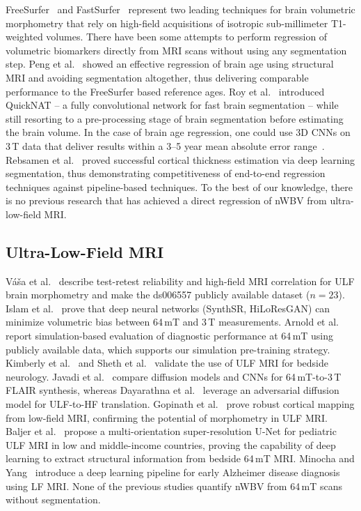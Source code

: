 \documentclass{ieeeaccess}
\begin{document}
FreeSurfer~\cite{fischl2012freesurfer} and
FastSurfer~\cite{henschel2020fastsurfer} represent two leading techniques for
brain volumetric morphometry that rely on high-field acquisitions of isotropic
sub-millimeter T1-weighted volumes. There have been some attempts to perform
regression of volumetric biomarkers directly from MRI scans without using any
segmentation step. Peng et al.~\cite{peng2021brain} showed an effective
regression of brain age using structural MRI and avoiding segmentation
altogether, thus delivering comparable performance to the FreeSurfer based
reference ages. Roy et al.~\cite{roy2019quicknat} introduced QuickNAT -- a
fully convolutional network for fast brain segmentation -- while still
resorting to a pre-processing stage of brain segmentation before estimating
the brain volume. In the case of brain age regression, one could use 3D CNNs
on 3\,T data that deliver results within a 3--5 year mean absolute error
range~\cite{cole2017predicting,jonsson2019brain}. Rebsamen et
al.~\cite{rebsamen2020cortical} proved successful cortical thickness estimation
via deep learning segmentation, thus demonstrating competitiveness of
end-to-end regression techniques against pipeline-based techniques. To the
best of our knowledge, there is no previous research that has achieved a
direct regression of nWBV from ultra-low-field MRI.

\subsection{Ultra-Low-Field MRI}

V{\'a}{\v s}a et al.~\cite{vasa2025imaneur,vasa2025} describe test-retest
reliability and high-field MRI correlation for ULF brain morphometry and make
the ds006557 publicly available dataset ($n = 23$). Islam et
al.~\cite{islam2025aibrain} prove that deep neural networks (SynthSR,
HiLoResGAN) can minimize volumetric bias between 64\,mT and 3\,T
measurements. Arnold et al.~\cite{arnold2022simulated} report
simulation-based evaluation of diagnostic performance at 64\,mT using
publicly available data, which supports our simulation pre-training strategy.
Kimberly et al.~\cite{kimberly2023bedside} and Sheth et
al.~\cite{sheth2021assessmentultralow} validate the use of ULF MRI for
bedside neurology. Javadi et al.~\cite{javadi2025diffusion} compare diffusion
models and CNNs for 64\,mT-to-3\,T FLAIR synthesis, whereas Dayarathna et
al.~\cite{dayarathna2024adversarial} leverage an adversarial diffusion model
for ULF-to-HF translation. Gopinath et al.~\cite{gopinath2025cortical} prove
robust cortical mapping from low-field MRI, confirming the potential of
morphometry in ULF MRI. Baljer et al.~\cite{baljer2024paediatric} propose a
multi-orientation super-resolution U-Net for pediatric ULF MRI in low and
middle-income countries, proving the capability of deep learning to extract
structural information from bedside 64\,mT MRI. Minocha and
Yang~\cite{minocha2024lfmri} introduce a deep learning pipeline for early
Alzheimer disease diagnosis using LF MRI. None of the previous studies
quantify nWBV from 64\,mT scans without segmentation.
\end{document}
